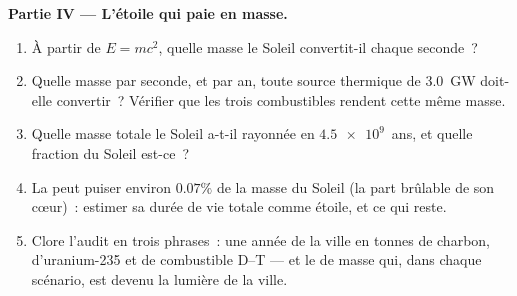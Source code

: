 \begin{problem}
\medskip
\noindent\textbf{Partie IV --- L'étoile qui paie en masse.}
\begin{enumerate}[resume]
  \item À partir de $E = mc^2$, quelle masse le Soleil convertit-il
        chaque seconde~?
  \item Quelle masse par seconde, et par an, toute source thermique
        de \qty{3.0}{GW} doit-elle convertir~? Vérifier que les trois
        combustibles rendent cette même masse.
  \item Quelle masse totale le Soleil a-t-il rayonnée en
        $\num{4.5e9}$~ans, et quelle fraction du Soleil est-ce~?
  \item La  peut puiser environ $0.07\%$ de la
        masse du Soleil (la part brûlable de son cœur)~: estimer sa
        durée de vie totale comme étoile, et ce qui reste.
  \item Clore l'audit en trois phrases~: une année de la ville en
        tonnes de charbon,  d'uranium-235
        et  de combustible D--T --- et le
         de masse qui, dans chaque
        scénario, est devenu la lumière de la ville.
\end{enumerate}
\end{problem}
